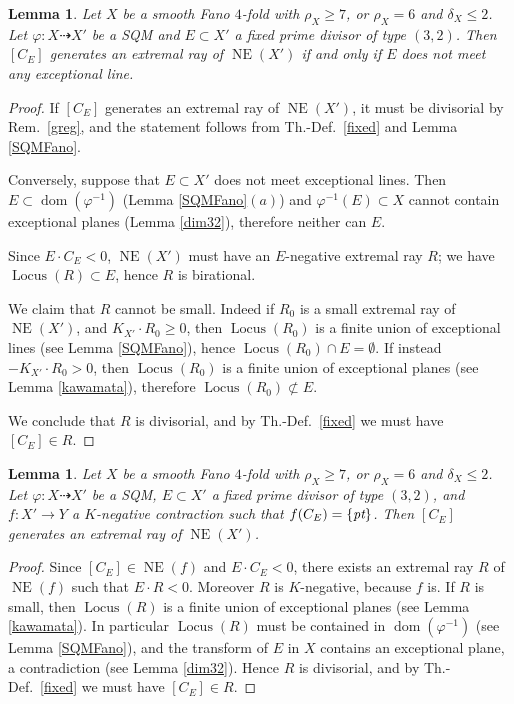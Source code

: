 \documentclass[a4paper,12pt]{amsart}
\newtheorem{lemma}[thm]{Lemma}
\theoremstyle{definition}
\numberwithin{figure}{section}
\numberwithin{table}{section}
\newcommand{\ph}{\varphi}
\newcommand{\dom}{\operatorname{dom}}
\newcommand{\NE}{\operatorname{NE}}
\newcommand{\Lo}{\operatorname{Locus}}
\newcommand{\pt}{\text{\it pt}}
\begin{document}
\begin{lemma}\label{iso32}
  Let $X$ be a smooth Fano $4$-fold with $\rho_X\geq 7$, or $\rho_X=6$ and $\delta_X\leq 2$. Let
 $\ph\colon X\dasharrow X'$ be a SQM and
  $E\subset X'$ a fixed prime divisor of type $(3,2)$. Then $[C_E]$ generates an extremal ray of $\NE(X')$ if and only if $E$ does not meet any exceptional line.
\end{lemma}
\begin{proof}
  If $[C_E]$ generates an extremal ray of $\NE(X')$, it must be divisorial
by Rem.~\ref{greg}, and
  the statement follows from  Th.-Def.~\ref{fixed} and Lemma \ref{SQMFano}.

Conversely, suppose that $E\subset X'$ does not meet  exceptional lines. Then   $E\subset\dom (\ph^{-1})$ (Lemma \ref{SQMFano}$(a)$) and  $\ph^{-1}(E)\subset X$ cannot contain exceptional planes (Lemma \ref{dim32}), therefore neither can $E$.

Since $E\cdot C_E<0$, $\NE(X')$ must have an $E$-negative extremal ray $R$; we have $\Lo(R)\subset E$, hence $R$ is birational.

  We claim that $R$ cannot be small. Indeed if $R_0$ is a small extremal ray of  $\NE(X')$, and $K_{X'}\cdot R_0\geq 0$, then $\Lo(R_0)$ is a finite union of exceptional lines (see Lemma \ref{SQMFano}), hence $\Lo(R_0)\cap E=\emptyset$. If instead $-K_{X'}\cdot R_0>0$, then $\Lo(R_0)$ is a finite union of exceptional planes (see Lemma \ref{kawamata}), therefore $\Lo(R_0)\not\subset E$.

  We conclude that $R$ is divisorial, and by Th.-Def.~\ref{fixed}
  we must have $[C_E]\in R$.
\end{proof}
\begin{lemma}\label{extremal}
Let $X$ be a smooth Fano $4$-fold with $\rho_X\geq 7$,  or $\rho_X=6$ and $\delta_X\leq 2$. Let $\ph\colon X\dasharrow X'$ be a SQM, $E\subset X'$ a fixed prime divisor of type $(3,2)$, and $f\colon X'\to Y$ a $K$-negative contraction such that $f(C_E)=\{\pt\}$. Then $[C_E]$ generates an extremal ray of $\NE(X')$.
\end{lemma}
\begin{proof}
  Since $[C_E]\in\NE(f)$ and $E\cdot C_E<0$, there exists an extremal ray $R$ of $\NE(f)$ such that $E\cdot R<0$. Moreover $R$ is $K$-negative, because $f$ is. If $R$ is small, then $\Lo(R)$ is a finite union of exceptional planes (see Lemma \ref{kawamata}). In particular $\Lo(R)$ must be contained in $\dom(\ph^{-1})$ (see Lemma \ref{SQMFano}), and the transform of $E$ in $X$ contains an exceptional plane, a contradiction (see Lemma \ref{dim32}).
    Hence $R$ is divisorial, and by Th.-Def.~\ref{fixed}
  we must have $[C_E]\in R$.
\end{proof} 
\end{document}
